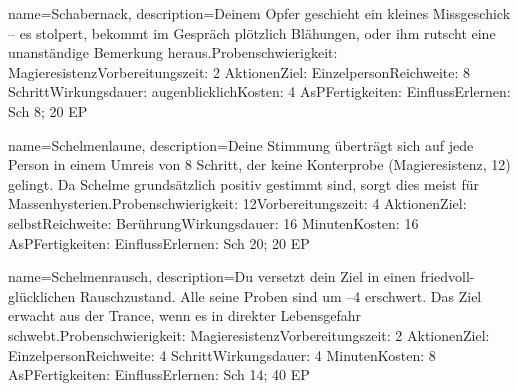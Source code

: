 {
    name={Schabernack},
    description={Deinem Opfer geschieht ein kleines Missgeschick – es stolpert, bekommt im Gespräch plötzlich Blähungen, oder ihm rutscht eine unanständige Bemerkung heraus.\newline Probenschwierigkeit: Magieresistenz\newline Vorbereitungszeit: 2 Aktionen\newline Ziel: Einzelperson\newline Reichweite: 8 Schritt\newline Wirkungsdauer: augenblicklich\newline Kosten: 4 AsP\newline Fertigkeiten: Einfluss\newline Erlernen: Sch 8; 20 EP}
}


{
    name={Schelmenlaune},
    description={Deine Stimmung überträgt sich auf jede Person in einem Umreis von 8 Schritt, der keine Konterprobe (Magieresistenz, 12) gelingt. Da Schelme grundsätzlich positiv gestimmt sind, sorgt dies meist für Massenhysterien.\newline Probenschwierigkeit: 12\newline Vorbereitungszeit: 4 Aktionen\newline Ziel: selbst\newline Reichweite: Berührung\newline Wirkungsdauer: 16 Minuten\newline Kosten: 16 AsP\newline Fertigkeiten: Einfluss\newline Erlernen: Sch 20; 20 EP}
}


{
    name={Schelmenrausch},
    description={Du versetzt dein Ziel in einen friedvoll-glücklichen Rauschzustand. Alle seine Proben sind um –4 erschwert. Das Ziel erwacht aus der Trance, wenn es in direkter Lebensgefahr schwebt.\newline Probenschwierigkeit: Magieresistenz\newline Vorbereitungszeit: 2 Aktionen\newline Ziel: Einzelperson\newline Reichweite: 4 Schritt\newline Wirkungsdauer: 4 Minuten\newline Kosten: 8 AsP\newline Fertigkeiten: Einfluss\newline Erlernen: Sch 14; 40 EP}
}


